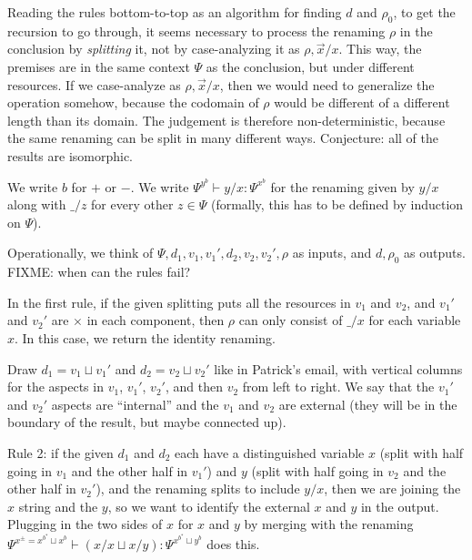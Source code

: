 \documentclass{amsart}
\let\types\vdash %
\let\mypm\pm
\def\pm{^\mypm}
\def\ps{+}
\def\ms{-}
\newcommand\uns{\times}
\def\flip#1{#1^*} %
\newcommand\combine{\sqcup}
\newcommand\triv{\_}
\begin{document}
Reading the rules bottom-to-top as an algorithm for finding $d$ and
$\rho_0$, to get the recursion to go through, it seems necessary to
process the renaming $\rho$ in the conclusion by \emph{splitting} it,
not by case-analyzing it as $\rho,\vec{x}/x$.  This way, the premises
are in the same context $\Psi$ as the conclusion, but under different
resources.  If we case-analyze as $\rho,\vec{x}/x$, then we would need
to generalize the operation somehow, because the codomain of $\rho$
would be different of a different length than its domain.  The judgement
is therefore non-deterministic, because the same renaming can be split
in many different ways.  Conjecture: all of the results are isomorphic.

We write $b$ for $\ps$ or $\ms$.  We write $\Psi^{y^b} \types y/x :
\Psi^{x^b}$ for the renaming given by $y/x$ along with $\triv/z$ for
every other $z \in \Psi$ (formally, this has to be defined by induction
on $\Psi$).

Operationally, we think of $\Psi,d_1,v_1,v_1',d_2,v_2,v_2',\rho$ as
inputs, and $d,\rho_0$ as outputs.  FIXME: when can the rules fail?

In the first rule, if the given splitting puts all the resources in
$v_1$ and $v_2$, and $v_1'$ and $v_2'$ are $\uns$ in each component,
then $\rho$ can only consist of $\triv/x$ for each variable $x$.  In
this case, we return the identity renaming.

Draw $d_1 = v_1 \combine v_1'$ and $d_2 = v_2 \combine v_2'$ like in
Patrick's email, with vertical columns for the aspects in $v_1$, $v_1'$,
$v_2'$, and then $v_2$ from left to right.  We say that the $v_1'$ and
$v_2'$ aspects are ``internal'' and the $v_1$ and $v_2$ are external
(they will be in the boundary of the result, but maybe connected up).

Rule 2: if the given $d_1$ and $d_2$ each have a distinguished variable
$x$ (split with half going in $v_1$ and the other half in $v_1'$) and
$y$ (split with half going in $v_2$ and the other half in $v_2'$), and
the renaming splits to include $y/x$, then we are joining the $x$ string
and the $y$, so we want to identify the external $x$ and $y$ in the
output.  Plugging in the two sides of $x$ for $x$ and $y$ by merging
with the renaming $\Psi^{x\pm = x^{\flip{b}} \combine x^b} \vdash (x/x
\combine x/y) : \Psi^{x^{\flip b} \combine y^{b}}$ does this.
\end{document}
